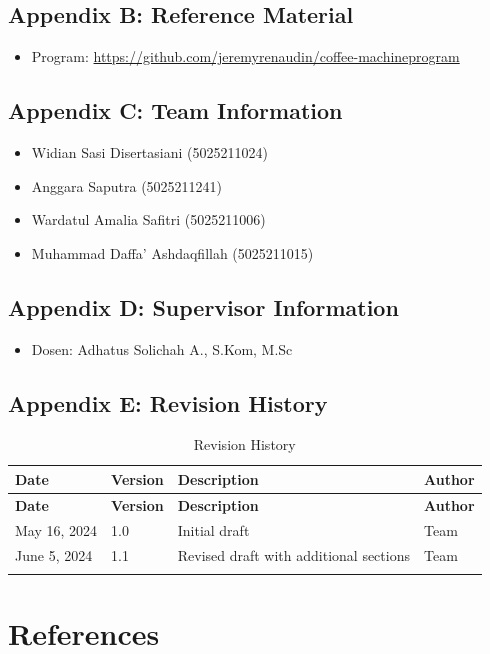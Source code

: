 \documentclass[12pt]{article}
\begin{document}
\subsection{Appendix B: Reference Material}

\begin{itemize}
    \item Program: \url{https://github.com/jeremyrenaudin/coffee-machineprogram}
\end{itemize}

\subsection{Appendix C: Team Information}

\begin{itemize}
    \item Widian Sasi Disertasiani (5025211024)
    \item Anggara Saputra (5025211241)
    \item Wardatul Amalia Safitri (5025211006)
    \item Muhammad Daffa’ Ashdaqfillah (5025211015)
\end{itemize}

\subsection{Appendix D: Supervisor Information}

\begin{itemize}
    \item Dosen: Adhatus Solichah A., S.Kom, M.Sc
\end{itemize}

\subsection{Appendix E: Revision History}

\begin{longtable}{|p{3cm}|p{2cm}|p{5cm}|p{3cm}|}
\hline
\textbf{Date} & \textbf{Version} & \textbf{Description} & \textbf{Author} \\
\hline
\endfirsthead
\hline
\textbf{Date} & \textbf{Version} & \textbf{Description} & \textbf{Author} \\
\hline
\endhead
May 16, 2024 & 1.0 & Initial draft & Team \\
\hline
June 5, 2024 & 1.1 & Revised draft with additional sections & Team \\
\hline
\caption{Revision History}
\end{longtable}

\section {References}



\end{document}
